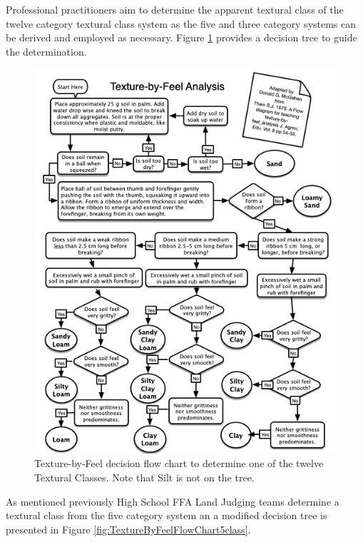 \documentclass[letterpaper, 12pt]{article}
\begin{document}
Professional practitioners aim to determine the apparent textural class of the twelve category textural class system as the five and three category systems can be derived and employed as necessary. Figure \ref{fig:TextureByFeelFlowChart12} provides a decision tree to guide the determination.

\begin{figure}
    \includegraphics[width=0.9\columnwidth]{images/TextureFlowChart.png}
    \caption{Texture-by-Feel decision flow chart to determine one of the twelve Textural Classes. Note that Silt is not on the tree.}
    \label{fig:TextureByFeelFlowChart12}
\end{figure}

As mentioned previously High School FFA Land Judging teams determine a textural class from the five category system an a modified decision tree is presented in Figure \ref{fig:TextureByFeelFlowChart5class}.
\end{document}
